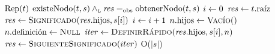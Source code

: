           {$\text{\normalfont Rep}(t)$}
          {$\text{\normalfont existeNodo}(t, s) \land_{\mathrm{\scriptscriptstyle{L}}} \text{\textit{res}} =_{\mathrm{obs}} \text{\normalfont obtenerNodo}(t, s)$}
          {
                \State $i \leftarrow 0$
                      \State $\text{\textit{res}} \leftarrow t.\text{\normalfont raíz}$
                             
                                \State $\text{\textit{res}} \leftarrow \text{\normalfont\textsc{Significado}}(\text{\textit{res}}.\text{\normalfont hijos}, s[i])$
                                          \State $i \leftarrow i + 1$
                                                  \EndWhile
                                                    \State $n.\text{\normalfont hijos} \leftarrow \text{\normalfont\textsc{Vacío}}()$
                                                          \State $n.\text{\normalfont definición} \leftarrow \textsc{Null}$
                                                                 
                                                                    \State $\text{\textit{iter}} \leftarrow \text{\normalfont\textsc{DefinirRápido}}(\text{\textit{res}}.\text{\normalfont hijos}, s[i], n)$
                                                                              \State $\text{\textit{res}} \leftarrow \text{\normalfont\textsc{SiguienteSignificado}}(iter)$
                                                                                      \EndWhile
          }{O($|s|$)}
